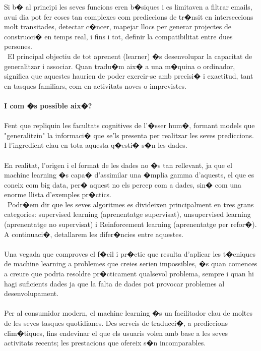\documentclass[12pt,a4paper,openright,oneside]{article}
\numberwithin{equation}{section}
\theoremstyle{definition}
\begin{document}
Si b� al principi les seves funcions eren b�siques i es limitaven a filtrar emails, avui dia pot fer coses tan complexes com prediccions de tr�nsit en interseccions molt transitades, detectar c�ncer, mapejar llocs per generar projectes de construcci� en temps real, i fins i tot, definir la compatibilitat entre dues persones.\\\
El principal objectiu de tot aprenent (learner) �s desenvolupar la capacitat de generalitzar i associar. Quan tradu�m aix� a una m�quina o ordinador, significa que aquestes haurien de poder exercir-se amb precisi� i exactitud, tant en tasques familiars, com en activitats noves o imprevistes.
\\\\
\textbf{I com �s possible aix�?}
\\\\
Fent que repliquin les facultats cognitives de l'�sser hum�, formant models que "generalitzin" la informaci� que se'ls presenta per realitzar les seves prediccions. I l'ingredient clau en tota aquesta q�esti� s�n les dades.
\\\\
En realitat, l'origen i el format de les dades no �s tan rellevant, ja que el machine learning �s capa� d'assimilar una �mplia gamma d'aquests, el que es coneix com big data, per� aquest no els percep com a dades, sin� com una enorme llista d'exemples pr�ctics.
\\\
Podr�em dir que les seves algoritmes es divideixen principalment en tres grans categories: supervised learning (aprenentatge supervisat), unsupervised learning (aprenentatge no supervisat) i Reinforcement learning (aprenentatge per refor�). A continuaci�, detallarem les difer�ncies entre aquestes.
\\\\
Una vegada que comproves el f�cil i pr�ctic que resulta d'aplicar les t�cniques de machine learning a problemes que creies serien impossibles, �s quan comences a creure que podria resoldre pr�cticament qualsevol problema, sempre i quan hi hagi suficients dades ja que la falta de dades pot provocar problemes al desenvolupament.\\\\
Per al consumidor modern, el machine learning �s un facilitador clau de moltes de les seves tasques quotidianes. Des serveis de traducci�, a prediccions clim�tiques, fins endevinar el que els usuaris volen amb base a les seves activitats recents; les prestacions que ofereix s�n incomparables.
\\\
\end{document}
